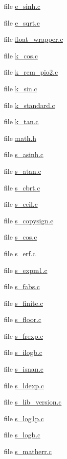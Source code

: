 \begin{DoxyCompactItemize}
\item 
file \hyperlink{e__sinh_8c}{e\+\_\+sinh.\+c}
\item 
file \hyperlink{e__sqrt_8c}{e\+\_\+sqrt.\+c}
\item 
file \hyperlink{float__wrapper_8c}{float\+\_\+wrapper.\+c}
\item 
file \hyperlink{k__cos_8c}{k\+\_\+cos.\+c}
\item 
file \hyperlink{k__rem__pio2_8c}{k\+\_\+rem\+\_\+pio2.\+c}
\item 
file \hyperlink{k__sin_8c}{k\+\_\+sin.\+c}
\item 
file \hyperlink{k__standard_8c}{k\+\_\+standard.\+c}
\item 
file \hyperlink{k__tan_8c}{k\+\_\+tan.\+c}
\item 
file \hyperlink{math_8h}{math.\+h}
\item 
file \hyperlink{s__asinh_8c}{s\+\_\+asinh.\+c}
\item 
file \hyperlink{s__atan_8c}{s\+\_\+atan.\+c}
\item 
file \hyperlink{s__cbrt_8c}{s\+\_\+cbrt.\+c}
\item 
file \hyperlink{s__ceil_8c}{s\+\_\+ceil.\+c}
\item 
file \hyperlink{s__copysign_8c}{s\+\_\+copysign.\+c}
\item 
file \hyperlink{s__cos_8c}{s\+\_\+cos.\+c}
\item 
file \hyperlink{s__erf_8c}{s\+\_\+erf.\+c}
\item 
file \hyperlink{s__expm1_8c}{s\+\_\+expm1.\+c}
\item 
file \hyperlink{s__fabs_8c}{s\+\_\+fabs.\+c}
\item 
file \hyperlink{s__finite_8c}{s\+\_\+finite.\+c}
\item 
file \hyperlink{s__floor_8c}{s\+\_\+floor.\+c}
\item 
file \hyperlink{s__frexp_8c}{s\+\_\+frexp.\+c}
\item 
file \hyperlink{s__ilogb_8c}{s\+\_\+ilogb.\+c}
\item 
file \hyperlink{s__isnan_8c}{s\+\_\+isnan.\+c}
\item 
file \hyperlink{s__ldexp_8c}{s\+\_\+ldexp.\+c}
\item 
file \hyperlink{s__lib__version_8c}{s\+\_\+lib\+\_\+version.\+c}
\item 
file \hyperlink{s__log1p_8c}{s\+\_\+log1p.\+c}
\item 
file \hyperlink{s__logb_8c}{s\+\_\+logb.\+c}
\item 
file \hyperlink{s__matherr_8c}{s\+\_\+matherr.\+c}

\end{DoxyCompactItemize}
